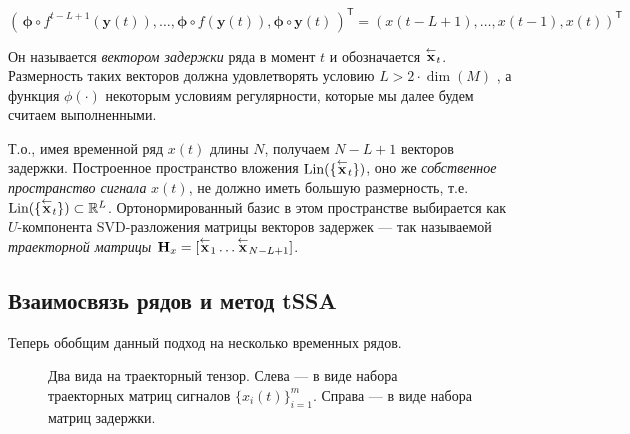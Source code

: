 		 	 \[
		 	 	( \, \boldsymbol{\phi} \circ f^{t - L + 1}(\mathbf{y}(t)), \ldots , \boldsymbol{\phi} \circ f(\mathbf{y}(t)), \boldsymbol{\phi} \circ \mathbf{y}(t) \,)^{\mathsf{T}} = (x(t - L + 1), \ldots , x(t-1), x(t))^{\mathsf{T}}
		 	 \] 
		 	 
		 	Он называется \emph{вектором задержки} ряда в момент $ t $ и обозначается $ \overset{\leftarrow}{\mathbf{x}}_{t} $. Размерность таких векторов должна удовлетворять условию $ L > 2 \cdot \dim(M) $ , а функция $ \phi(\cdot) $ некоторым условиям регулярности, которые мы далее будем считаем выполненными.
		 	
		 	Т.о., имея временной ряд $ x(t) $ длины $ N $, получаем $ N - L + 1 $ векторов задержки. Построенное пространство вложения $ \text{Lin}(\{\overset{\leftarrow}{\mathbf{x}}_{t}\}) $, оно же \emph{собственное пространство сигнала} $ x(t) $, не должно иметь большую размерность, т.е. $ \text{Lin}(\{\overset{\leftarrow}{\mathbf{x}}_{t}\}) \subset \mathbb{R}^L $. Ортонормированный базис в этом пространстве выбирается как $ U $-компонента SVD-разложения матрицы векторов задержек --- так называемой \emph{траекторной матрицы} $ \mathbf{H}_x = [ \overset{\leftarrow}{\mathbf{x}}_{1} \ldots  \overset{\leftarrow}{\mathbf{x}}_{N - L + 1}] $.
		 	
		 \subsection*{Взаимосвязь рядов и метод tSSA}\label{sec:tssa_method}
		 
		 	Теперь обобщим данный подход на несколько временных рядов.
		 
		 	\begin{figure}[h]
		 		\centering
		 		
		 		\caption{Два вида на траекторный тензор. Слева --- в виде набора траекторных матриц сигналов $ \{x_i(t)\}_{i=1}^m $. Справа --- в виде набора матриц задержки.}\label{pic:traj_tensor}
		 	\end{figure}
	    
